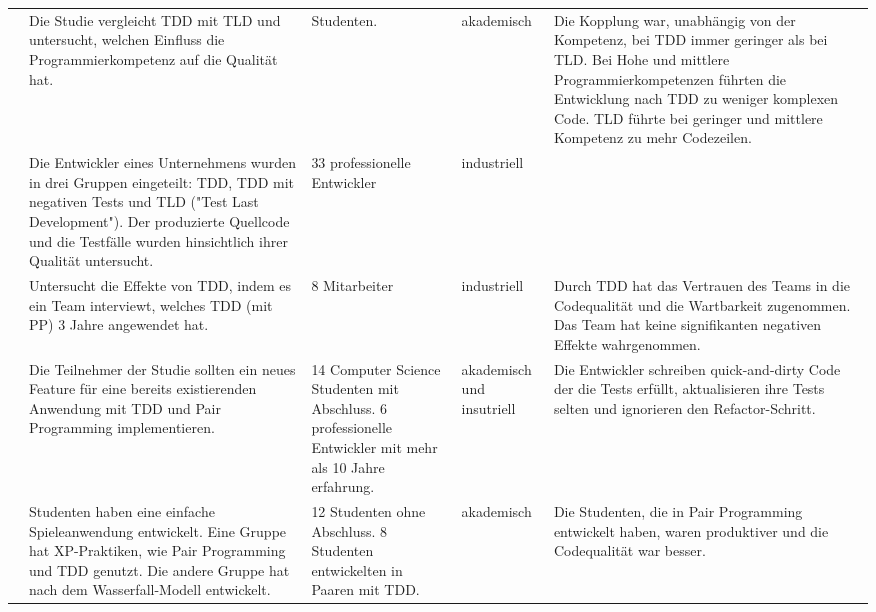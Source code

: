 \begin{table*}[p]
\begin{tabularx}{\textwidth}{@{}Xp{}p{}p{}p{}@{}}
\cite{Yahya2015TheDevelopment}               & Die Studie vergleicht TDD mit TLD und untersucht, welchen Einfluss die Programmierkompetenz auf die Qualität hat.                                                                                                                        & Studenten.                                                                                                                                                     & akademisch                & Die Kopplung war, unabhängig von der Kompetenz, bei TDD immer geringer als bei TLD. Bei Hohe und mittlere Programmierkompetenzen führten die Entwicklung nach TDD zu weniger komplexen Code. TLD führte bei geringer und mittlere Kompetenz zu mehr Codezeilen. \\
\cite{Causevic2013EffectsExperiment} & Die Entwickler eines Unternehmens wurden in drei Gruppen eingeteilt: TDD, TDD mit negativen Tests und TLD ("Test Last Development"). Der produzierte Quellcode und die Testfälle wurden hinsichtlich ihrer Qualität untersucht. & 33 professionelle Entwickler                                                                              & industriell               &                                                                                                                                                            \\
\cite{Marchenko2009Long-TermStudy}   & Untersucht die Effekte von TDD, indem es ein Team interviewt, welches TDD (mit PP) 3 Jahre angewendet hat.                                                                                                                      & 8 Mitarbeiter                                                                                             & industriell               & Durch TDD hat das Vertrauen des Teams in die Codequalität und die Wartbarkeit zugenommen. Das Team hat keine signifikanten negativen Effekte wahrgenommen. \\
\cite{Romano2017FindingsDevelopment} & Die Teilnehmer der Studie sollten ein neues Feature für eine bereits existierenden Anwendung mit TDD und Pair Programming implementieren.                                                                                       & 14 Computer Science Studenten mit Abschluss. 6 professionelle Entwickler mit mehr als 10 Jahre erfahrung. & akademisch und insutriell & Die Entwickler schreiben quick-and-dirty Code der die Tests erfüllt, aktualisieren ihre Tests selten und ignorieren den Refactor-Schritt.                  \\
\cite{Xu2006EmpiricalDevelopment}    & Studenten haben eine einfache Spieleanwendung entwickelt. Eine Gruppe hat XP-Praktiken, wie Pair Programming und TDD genutzt. Die andere Gruppe hat nach dem Wasserfall-Modell entwickelt.                                      & 12 Studenten ohne Abschluss. 8 Studenten entwickelten in Paaren mit TDD.                                  & akademisch                & Die Studenten, die in Pair Programming entwickelt haben, waren produktiver und die Codequalität war besser.                                                \\ \bottomrule

\end{tabularx}
\end{table*}
